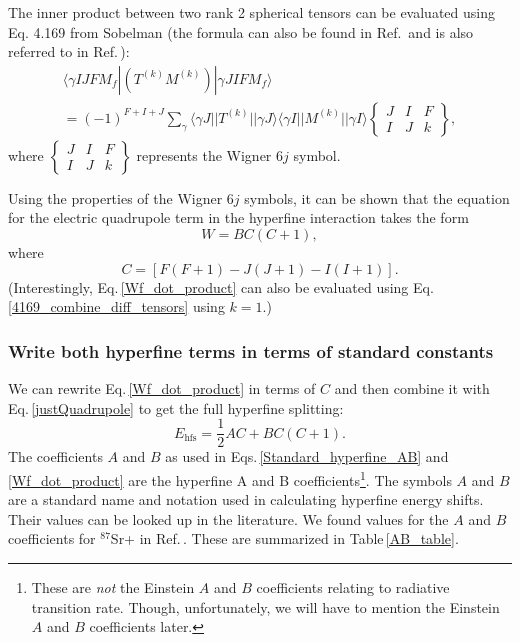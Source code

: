 The inner product between two rank 2 spherical tensors can be evaluated using Eq. 4.169 from Sobelman \cite{sobelman_spectra} (the formula can also be found in Ref.\,\cite{Racah2} and is also referred to in Ref.\,\cite{schwartz_hyperfine_expansion}):
\begin{multline}\label{4169_combine_diff_tensors}
\langle\gamma I J F M_f|(T^{(k)}M^{(k)})|\gamma J I F M_f\rangle \\
=
(-1)^{F+I+J} \sum_{\gamma} \langle\gamma J||T^{(k)}||\gamma J\rangle
\langle\gamma I || M^{(k)} ||\gamma I\rangle
\begin{Bmatrix}
J & I & F \\
I & J & k
\end{Bmatrix},
\end{multline}
where 
$\begin{Bmatrix}
J & I & F \\
I & J & k
\end{Bmatrix}$ represents the Wigner $6j$ symbol. 

Using the properties of the Wigner $6j$ symbols, it can be shown that %
the equation for the electric quadrupole term in the hyperfine interaction takes the form \cite{cuaMITnotes}\cite{sobelman_spectra} 
\begin{equation}\label{justQuadrupole}
W=BC(C+1),
\end{equation}
where 
\begin{equation}
C=[F(F+1)-J(J+1)-I(I+1)].
\end{equation}
(Interestingly, Eq.\,\ref{Wf_dot_product} can also be evaluated using Eq.\,\ref{4169_combine_diff_tensors} using $k=1$.)

\subsubsection{Write both hyperfine terms in terms of standard constants}
We can rewrite Eq.\,\eqref{Wf_dot_product} in terms of $C$ 
and then combine it with Eq.\,\eqref{justQuadrupole} to get the full hyperfine splitting\cite{cuaMITnotes}: 
\begin{equation}\label{Standard_hyperfine_AB}
E_{\mathrm{hfs}}=\frac{1}{2}AC+BC(C+1).
\end{equation}
The coefficients $A$ and $B$ as used in Eqs.\,\ref{Standard_hyperfine_AB} and \ref{Wf_dot_product} are the hyperfine A and B coefficients\footnote{These are \emph{not} the Einstein $A$ and $B$ coefficients relating to radiative transition rate. Though, unfortunately, we will have to mention the Einstein $A$ and $B$ coefficients later.}. The symbols $A$ and $B$ are a standard name and notation used in calculating hyperfine energy shifts. Their values can be looked up in the literature\cite{cuaMITnotes}.  We found values for the $A$ and $B$ coefficients for $^{87}$Sr+ in Ref.\,\cite{safronova2photon}. These are summarized in Table\,\ref{AB_table}.  

